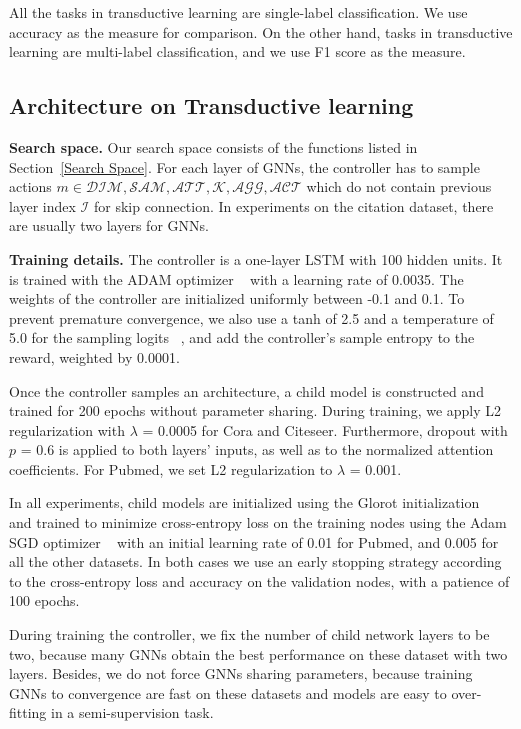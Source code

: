 \documentclass{article}
\begin{document}
All the tasks in transductive learning are single-label classification. We use accuracy as the measure for comparison. On the other hand, tasks in transductive learning are multi-label classification, and we use F1 score as the measure.

\subsection{Architecture on Transductive learning}


\textbf{Search space.} Our search space consists of the functions listed in Section~\ref{Search Space}. For each layer of GNNs, the controller  has to sample actions $m \in {\mathcal{DIM},\mathcal{SAM},\mathcal{ATT},\mathcal{K},\mathcal{AGG},\mathcal{ACT}}$ which do not contain previous layer index $\mathcal{I}$ for skip connection. In experiments on the citation dataset, there are usually two layers for GNNs. 

\textbf{Training details.} The controller is a one-layer LSTM with 100 hidden units. It is trained with the ADAM optimizer ~\cite{Kingma2015AdamAM} with a learning rate of 0.0035. The weights of the controller are initialized uniformly between -0.1 and 0.1. To prevent premature convergence, we also use a tanh of 2.5 and a temperature of 5.0 for the sampling logits ~\cite{Bello2017NeuralOS,Bello2016NeuralCO},
and add the controller’s sample entropy to the reward, weighted by 0.0001. 

Once the controller samples an architecture, a child model is constructed and trained for 200 epochs without parameter sharing. During training, we apply L2 regularization with $\lambda$  = 0.0005 for Cora and Citeseer. Furthermore, dropout with $p$ = 0.6 is applied to both layers’ inputs, as well as to the normalized attention coefficients. For Pubmed, we set L2 regularization to $\lambda$  = 0.001. 

In all experiments, child models are initialized using the Glorot initialization ~\cite{Glorot2010UnderstandingTD} and trained to minimize cross-entropy loss on the training nodes using the Adam SGD optimizer ~\cite{Kingma2015AdamAM} with an initial learning rate of 0.01 for Pubmed, and 0.005 for all the other datasets. In both cases we use an early stopping strategy according to  the cross-entropy loss and accuracy on the validation nodes, with a patience of 100 epochs.

During training the controller, we fix the number of child network layers to be two, because many GNNs obtain the best performance on these dataset with two layers. 
Besides, we do not force GNNs sharing parameters, because training GNNs to convergence are fast on these datasets and models are easy to over-fitting in a semi-supervision task.
\end{document}

